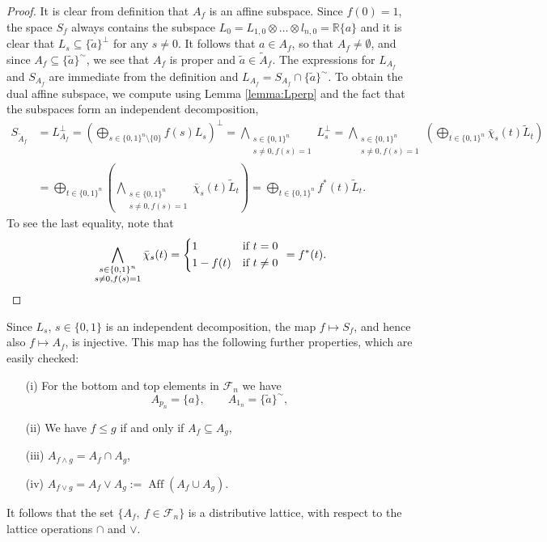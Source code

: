 \documentclass[12pt]{article}
\theoremstyle{definition}
\theoremstyle{remark}
\def\aff{\operatorname{Aff}}
\def\Fe{\mathcal F}
\begin{document}
\begin{proof} It is clear from definition that $A_f$ is an affine subspace. Since
$f(0)=1$, the space $S_f$ always contains the subspace $L_0=L_{1,0}\otimes\dots\otimes
l_{n,0}=\mathbb R\{a\}$ and it is clear that $L_s\subseteq \{\tilde a\}^\perp$ for any
$s\ne 0$. It follows that $a\in A_f$, so that $A_f\ne \emptyset$, and since $A_f\subseteq
\{\tilde a\}^\sim$, we see that  $A_f$ is proper and $\tilde
a\in \tilde A_f$.  The expressions for $L_{A_f}$ and $S_{A_f}$ are immediate from the definition and
$L_{A_f}=S_{A_f}\cap\{\tilde a\}^\sim$. To obtain the dual affine subspace, we compute
using Lemma \ref{lemma:Lperp} and the fact that the subspaces form an independent
decomposition,
\begin{align*}
S_{\tilde A_f}&=L_{A_f}^\perp=\left(\bigoplus_{s\in\{0,1\}^n\setminus\{0\}}
f(s)L_s\right)^\perp=
\bigwedge_{\substack{s\in\{0,1\}^n\\ s\ne 0, f(s)=1}}L_s^\perp=
\bigwedge_{\substack{s\in\{0,1\}^n\\ s\ne 0,
f(s)=1}}\left(\bigoplus_{t\in\{0,1\}^n} \bar{\chi}_s(t)\tilde L_t\right)\\
&=\bigoplus_{t\in\{0,1\}^n} \left(\bigwedge_{\substack{s\in \{0,1\}^n\\ s\ne 0, f(s)=1}}
\bar{\chi}_s(t)\tilde L_t\right)=\bigoplus_{t\in \{0,1\}^n} f^*(t) \tilde L_t.
\end{align*}
To see the last equality, note that
\[
\bigwedge_{\substack{s\in \{0,1\}^n\\ s\ne 0, f(s)=1}}
\bar{\chi}_s(t)=\begin{dcases} 1 & \text{if } t=0\\ 1-f(t) & \text{if } t\ne 0
\end{dcases} \ = f^*(t).
\]


\end{proof}

Since $L_s$, $s\in \{0,1\}$ is an independent decomposition, the map $f\mapsto S_f$, and
hence also $f\mapsto A_f$, is injective. This map  has the following further properties, which are easily checked:
\begin{enumerate}
\item[(i)] For the bottom and top elements in $\Fe_n$ we have
\[
A_{p_n}=\{a\},\qquad A_{1_n}=\{\tilde a\}^\sim,
\]
\item[(ii)] We have $f\le g$ if and only if $A_f\subseteq A_g$,
\item[(iii)] $A_{f\wedge g}=A_f\cap A_g$,
\item[(iv)] $A_{f\vee g}= A_f\vee A_g:=\aff(A_f\cup A_g)$.
\end{enumerate}
It follows that the set $\{A_f,\ f\in
\Fe_n\}$ is a distributive lattice, with respect to the lattice operations $\cap$ and
$\vee$.
\end{document}
